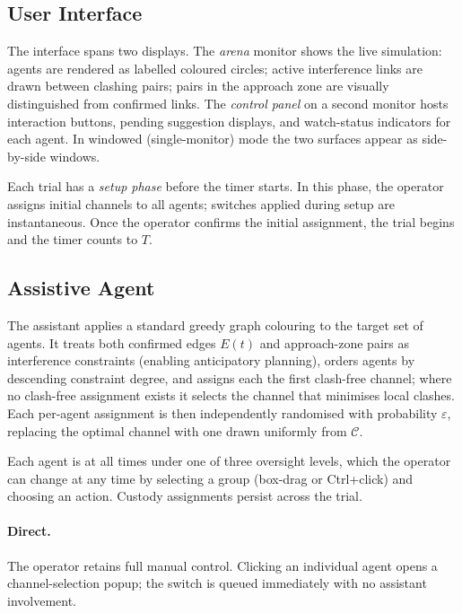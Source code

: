 \documentclass[10pt]{article}
\theoremstyle{definition}
\begin{document}
\subsection{User Interface}\label{sec:ui}

The interface spans two displays.
The \emph{arena} monitor shows the live simulation: agents are rendered as labelled coloured circles; active interference links are drawn between clashing pairs; pairs in the approach zone are visually distinguished from confirmed links. The \emph{control panel} on a second monitor hosts interaction buttons, pending suggestion displays, and watch-status indicators for each agent. In windowed (single-monitor) mode the two surfaces appear as side-by-side windows.

Each trial has a \emph{setup phase} before the timer starts. In this phase, the operator assigns initial channels to all agents; switches applied during setup are instantaneous. Once the operator confirms the initial assignment, the trial begins and the timer counts to $T$.

\subsection{Assistive Agent}\label{sec:agent}

The assistant applies a standard greedy graph colouring to the target set of agents. It treats both confirmed edges $E(t)$ and approach-zone pairs as interference constraints (enabling anticipatory planning), orders agents by descending constraint degree, and assigns each the first clash-free channel; where no clash-free assignment exists it selects the channel that minimises local clashes. Each per-agent assignment is then independently randomised with probability $\varepsilon$, replacing the optimal channel with one drawn uniformly from $\mathcal{C}$.

\label{sec:modes}
Each agent is at all times under one of three oversight levels, which the operator can change at any time by selecting a group (box-drag or Ctrl+click) and choosing an action. Custody assignments persist across the trial.

\paragraph{Direct.}
The operator retains full manual control. Clicking an individual agent opens a channel-selection popup; the switch is queued immediately with no assistant involvement.
\end{document}
